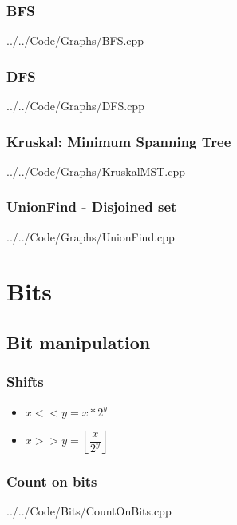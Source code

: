 \documentclass[11pt, fleqn]{report}                             %
\theoremstyle{break}                                            %
\begin{document}
\begin{multicols}{2}
            \vfill\null
            \columnbreak

    \section{BFS}
        
        {../../Code/Graphs/BFS.cpp}

    \section{DFS}
        
        {../../Code/Graphs/DFS.cpp}

    \section{Kruskal: Minimum Spanning Tree}
        
        {../../Code/Graphs/KruskalMST.cpp}

    \pagebreak

    \section{UnionFind - Disjoined set}
        
        {../../Code/Graphs/UnionFind.cpp}
            
\part{Bits}

    \chapter{Bit manipulation}

    \section{Shifts}

        \begin{itemize}
            \item $x << y = x * 2^y$
            \item $x >> y = \left \lfloor \dfrac{x}{2^y} \right \rfloor$
        \end{itemize}

    \section{Count on bits}
        
        {../../Code/Bits/CountOnBits.cpp}
    

\end{multicols}
\end{document}
